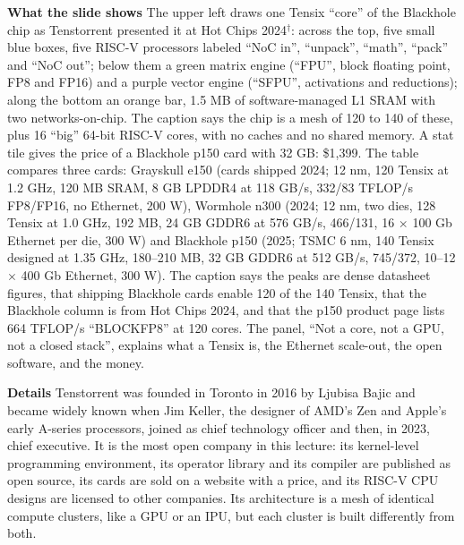 \documentclass[11pt,letterpaper]{article}
\newcommand{\para}[1]{\medskip\noindent\textbf{#1}\quad}
\begin{document}
\para{What the slide shows} The upper left draws one Tensix ``core'' of the Blackhole chip as Tenstorrent presented it at Hot Chips 2024$^\dagger$: across the top, five small blue boxes, five RISC-V processors labeled ``NoC in'', ``unpack'', ``math'', ``pack'' and ``NoC out''; below them a green matrix engine (``FPU'', block floating point, FP8 and FP16) and a purple vector engine (``SFPU'', activations and reductions); along the bottom an orange bar, 1.5 MB of software-managed L1 SRAM with two networks-on-chip. The caption says the chip is a mesh of 120 to 140 of these, plus 16 ``big'' 64-bit RISC-V cores, with no caches and no shared memory. A stat tile gives the price of a Blackhole p150 card with 32 GB: \$1{,}399. The table compares three cards: Grayskull e150 (cards shipped 2024; 12 nm, 120 Tensix at 1.2 GHz, 120 MB SRAM, 8 GB LPDDR4 at 118 GB/s, 332/83 TFLOP/s FP8/FP16, no Ethernet, 200 W), Wormhole n300 (2024; 12 nm, two dies, 128 Tensix at 1.0 GHz, 192 MB, 24 GB GDDR6 at 576 GB/s, 466/131, 16 $\times$ 100 Gb Ethernet per die, 300 W) and Blackhole p150 (2025; TSMC 6 nm, 140 Tensix designed at 1.35 GHz, 180--210 MB, 32 GB GDDR6 at 512 GB/s, 745/372, 10--12 $\times$ 400 Gb Ethernet, 300 W). The caption says the peaks are dense datasheet figures, that shipping Blackhole cards enable 120 of the 140 Tensix, that the Blackhole column is from Hot Chips 2024, and that the p150 product page lists 664 TFLOP/s ``BLOCKFP8'' at 120 cores. The panel, ``Not a core, not a GPU, not a closed stack'', explains what a Tensix is, the Ethernet scale-out, the open software, and the money.

\para{Details} Tenstorrent was founded in Toronto in 2016 by Ljubisa Bajic and became widely known when Jim Keller, the designer of AMD's Zen and Apple's early A-series processors, joined as chief technology officer and then, in 2023, chief executive. It is the most open company in this lecture: its kernel-level programming environment, its operator library and its compiler are published as open source, its cards are sold on a website with a price, and its RISC-V CPU designs are licensed to other companies. Its architecture is a mesh of identical compute clusters, like a GPU or an IPU, but each cluster is built differently from both.
\end{document}
